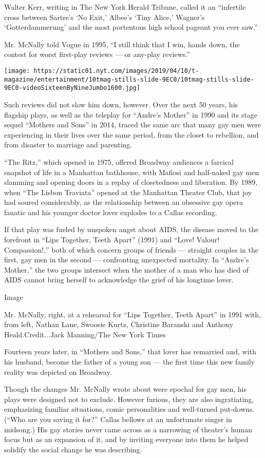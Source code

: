 Walter Kerr, writing in The New York Herald Tribune, called it an
``infertile cross between Sartre's `No Exit,' Albee's `Tiny Alice,'
Wagner's `Gotterdammerung' and the most portentous high school pageant
you ever saw.''

Mr. McNally told Vogue in 1995, ``I still think that I win, hands down,
the contest for worst first-play reviews --- or any-play reviews.''

\texttt{[image: https://static01.nyt.com/images/2019/04/10/t-magazine/entertainment/10tmag-stills-slide-9EC0/10tmag-stills-slide-9EC0-videoSixteenByNineJumbo1600.jpg]}

Such reviews did not slow him down, however. Over the next 50 years, his
flagship plays, as well as the teleplay for ``Andre's Mother'' in 1990
and its stage sequel ``Mothers and Sons'' in 2014, traced the same arc
that many gay men were experiencing in their lives over the same period,
from the closet to rebellion, and from disaster to marriage and
parenting.

``The Ritz,'' which opened in 1975, offered Broadway audiences a
farcical snapshot of life in a Manhattan bathhouse, with Mafiosi and
half-naked gay men slamming and opening doors in a replay of
closetedness and liberation. By 1989, when ``The Lisbon Traviata''
opened at the Manhattan Theater Club, that joy had soured considerably,
as the relationship between an obsessive gay opera fanatic and his
younger doctor lover explodes to a Callas recording.

If that play was fueled by unspoken angst about AIDS, the disease moved
to the forefront in ``Lips Together, Teeth Apart'' (1991) and ``Love!
Valour! Compassion!,'' both of which concern groups of friends ---
straight couples in the first, gay men in the second --- confronting
unexpected mortality. In ``Andre's Mother,'' the two groups intersect
when the mother of a man who has died of AIDS cannot bring herself to
acknowledge the grief of his longtime lover.

Image

Mr. McNally, right, at a rehearsal for ``Lips Together, Teeth Apart'' in
1991 with, from left, Nathan Lane, Swoosie Kurtz, Christine Baranski and
Anthony Heald.Credit...Jack Manning/The New York Times

Fourteen years later, in ``Mothers and Sons,'' that lover has remarried
and, with his husband, become the father of a young son --- the first
time this new family reality was depicted on Broadway.

Though the changes Mr. McNally wrote about were epochal for gay men, his
plays were designed not to exclude. However furious, they are also
ingratiating, emphasizing familiar situations, comic personalities and
well-turned put-downs. (``Who are you saving it for?'' Callas bellows at
an unfortunate singer in midsong.) His gay stories never came across as
a narrowing of theater's human focus but as an expansion of it, and by
inviting everyone into them he helped solidify the social change he was
describing.


